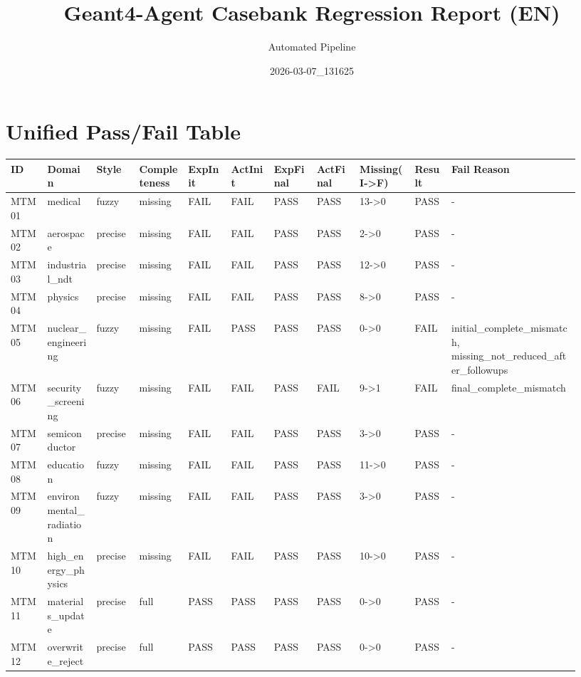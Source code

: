 \documentclass[11pt]{ctexart}
\title{Geant4-Agent Casebank Regression Report (EN)}
\author{Automated Pipeline}
\date{2026-03-07\_131625}
\begin{document}
\maketitle
\section{Unified Pass/Fail Table}
\begin{longtable}{p{0.06\linewidth}p{0.08\linewidth}p{0.07\linewidth}p{0.08\linewidth}p{0.07\linewidth}p{0.07\linewidth}p{0.07\linewidth}p{0.07\linewidth}p{0.09\linewidth}p{0.06\linewidth}p{0.21\linewidth}}
\toprule
ID & Domain & Style & Completeness & ExpInit & ActInit & ExpFinal & ActFinal & Missing(I->F) & Result & Fail Reason \\
\midrule
MTM01 & medical & fuzzy & missing & FAIL & FAIL & PASS & PASS & 13->0 & PASS & - \\
MTM02 & aerospace & precise & missing & FAIL & FAIL & PASS & PASS & 2->0 & PASS & - \\
MTM03 & industrial\_ndt & precise & missing & FAIL & FAIL & PASS & PASS & 12->0 & PASS & - \\
MTM04 & physics & precise & missing & FAIL & FAIL & PASS & PASS & 8->0 & PASS & - \\
MTM05 & nuclear\_engineering & fuzzy & missing & FAIL & PASS & PASS & PASS & 0->0 & FAIL & initial\_complete\_mismatch, missing\_not\_reduced\_after\_followups \\
MTM06 & security\_screening & fuzzy & missing & FAIL & FAIL & PASS & FAIL & 9->1 & FAIL & final\_complete\_mismatch \\
MTM07 & semiconductor & precise & missing & FAIL & FAIL & PASS & PASS & 3->0 & PASS & - \\
MTM08 & education & fuzzy & missing & FAIL & FAIL & PASS & PASS & 11->0 & PASS & - \\
MTM09 & environmental\_radiation & fuzzy & missing & FAIL & FAIL & PASS & PASS & 3->0 & PASS & - \\
MTM10 & high\_energy\_physics & precise & missing & FAIL & FAIL & PASS & PASS & 10->0 & PASS & - \\
MTM11 & materials\_update & precise & full & PASS & PASS & PASS & PASS & 0->0 & PASS & - \\
MTM12 & overwrite\_reject & precise & full & PASS & PASS & PASS & PASS & 0->0 & PASS & - \\
\bottomrule
\end{longtable}
\end{document}
